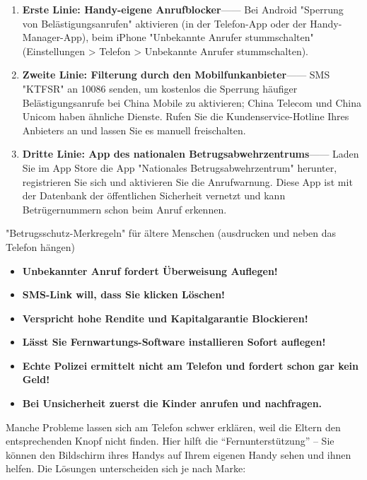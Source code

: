 
\begin{enumerate}
  \item \textbf{Erste Linie: Handy-eigene Anrufblocker}—— Bei Android "Sperrung von Belästigungsanrufen" aktivieren (in der Telefon-App oder der Handy-Manager-App), beim iPhone "Unbekannte Anrufer stummschalten" (Einstellungen > Telefon > Unbekannte Anrufer stummschalten).
  \item \textbf{Zweite Linie: Filterung durch den Mobilfunkanbieter}—— SMS "KTFSR" an 10086 senden, um kostenlos die Sperrung häufiger Belästigungsanrufe bei China Mobile zu aktivieren; China Telecom und China Unicom haben ähnliche Dienste. Rufen Sie die Kundenservice-Hotline Ihres Anbieters an und lassen Sie es manuell freischalten.
  \item \textbf{Dritte Linie: App des nationalen Betrugsabwehrzentrums}—— Laden Sie im App Store die App "Nationales Betrugsabwehrzentrum" herunter, registrieren Sie sich und aktivieren Sie die Anrufwarnung. Diese App ist mit der Datenbank der öffentlichen Sicherheit vernetzt und kann Betrügernummern schon beim Anruf erkennen.
\end{enumerate}

\begin{tcbwarn}{"Betrugsschutz-Merkregeln" für ältere Menschen (ausdrucken und neben das Telefon hängen)}
\begin{itemize}
  \item \textbf{Unbekannter Anruf fordert Überweisung Auflegen!}
  \item \textbf{SMS-Link will, dass Sie klicken Löschen!}
  \item \textbf{Verspricht hohe Rendite und Kapitalgarantie Blockieren!}
  \item \textbf{Lässt Sie Fernwartungs-Software installieren Sofort auflegen!}
  \item \textbf{Echte Polizei ermittelt nicht am Telefon und fordert schon gar kein Geld!}
  \item \textbf{Bei Unsicherheit zuerst die Kinder anrufen und nachfragen.}
\end{itemize}

\end{tcbwarn}


Manche Probleme lassen sich am Telefon schwer erklären, weil die Eltern den entsprechenden Knopf nicht finden. Hier hilft die “Fernunterstützung” – Sie können den Bildschirm ihres Handys auf Ihrem eigenen Handy sehen und ihnen helfen. Die Lösungen unterscheiden sich je nach Marke:

